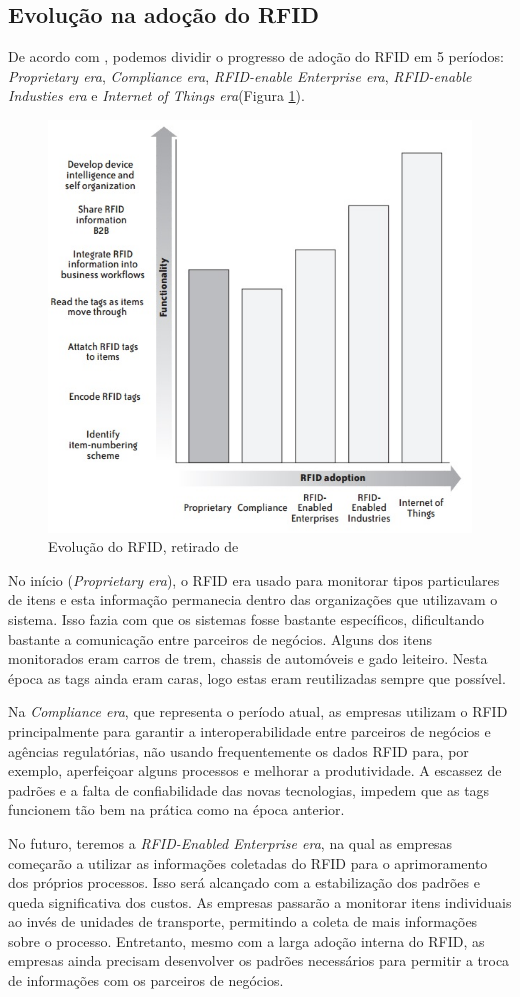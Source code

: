 	\subsection{Evolução na adoção do RFID}
	De acordo com \cite{rfidbook}, podemos dividir o progresso de adoção do RFID em 5 períodos: \textit{Proprietary era}, \textit{Compliance era}, \textit{RFID-enable Enterprise era}, \textit{RFID-enable Industies era} e \textit{Internet of Things era}(Figura \ref{fig:rfideras}).
	
	\begin{figure}[h!]
		\centering
		\includegraphics[width=0.6\linewidth]{rfideras}
		\caption{Evolução do RFID, retirado de \cite{rfidbook}}
		\label{fig:rfideras}
	\end{figure}
	
	No início (\textit{Proprietary era}), o RFID era usado para monitorar tipos particulares de itens e esta informação permanecia dentro das organizações que utilizavam o sistema. Isso fazia com que os sistemas fosse bastante específicos, dificultando bastante a comunicação entre parceiros de negócios. Alguns dos itens monitorados eram carros de trem, chassis de automóveis e gado leiteiro. Nesta época as tags ainda eram caras, logo estas eram reutilizadas sempre que possível. 
	
	Na \textit{Compliance era}, que representa o período atual, as empresas utilizam o RFID principalmente para garantir a interoperabilidade entre parceiros de negócios e agências regulatórias, não usando frequentemente os dados RFID para, por exemplo, aperfeiçoar alguns processos e melhorar a produtividade. A escassez de padrões e a falta de confiabilidade das novas tecnologias, impedem que as tags funcionem tão bem na prática como na época anterior.
	
	No futuro, teremos a \textit{RFID-Enabled Enterprise era}, na qual as empresas começarão a utilizar as informações coletadas do RFID para o aprimoramento dos próprios processos. Isso será alcançado com a estabilização dos padrões e queda significativa dos custos. As empresas passarão a monitorar itens individuais ao invés de unidades de transporte, permitindo a coleta de mais informações sobre o processo. Entretanto, mesmo com a larga adoção interna do RFID, as empresas ainda precisam desenvolver os padrões necessários para permitir a troca de informações com os parceiros de negócios. 
	

